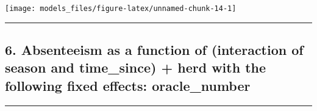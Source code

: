 \documentclass[]{article}
\begin{document}
\begin{center}\texttt{[image: models\_files/figure-latex/unnamed-chunk-14-1]} \end{center}

\newpage

\begin{center}\rule{0.5\linewidth}{\linethickness}\end{center}

\subsection{6. Absenteeism as a function of (interaction of season and
time\_since) + herd with the following fixed effects:
oracle\_number}\label{absenteeism-as-a-function-of-interaction-of-season-and-time_since-herd-with-the-following-fixed-effects-oracle_number}

\begin{center}\rule{0.5\linewidth}{\linethickness}\end{center}
\end{document}
